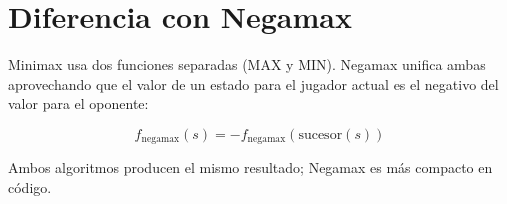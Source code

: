 \documentclass[12pt,a4paper]{article}
\begin{document}
\section{Diferencia con Negamax}

Minimax usa dos funciones separadas (MAX y MIN). Negamax unifica ambas aprovechando que el valor de un estado para el jugador actual es el negativo del valor para el oponente:

\[f_{\text{negamax}}(s) = -f_{\text{negamax}}(\text{sucesor}(s))\]

Ambos algoritmos producen el mismo resultado; Negamax es más compacto en código.
\end{document}
